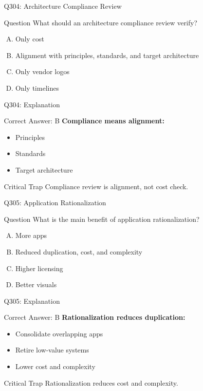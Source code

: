 \documentclass{beamer}
\begin{document}
	\begin{frame}{Q304: Architecture Compliance Review}
		\begin{block}{Question}
			What should an architecture compliance review verify?
		\end{block}
		\begin{enumerate}[(A)]
			\item Only cost
			\item Alignment with principles, standards, and target architecture
			\item Only vendor logos
			\item Only timelines
		\end{enumerate}
	\end{frame}
	
	\begin{frame}{Q304: Explanation}
		\begin{block}{Correct Answer: B}
			\textbf{Compliance means alignment:}
			\begin{itemize}
				\item Principles
				\item Standards
				\item Target architecture
			\end{itemize}
		\end{block}
		\begin{alertblock}{Critical Trap}
			Compliance review is alignment, not cost check.
		\end{alertblock}
	\end{frame}
	
	\begin{frame}{Q305: Application Rationalization}
		\begin{block}{Question}
			What is the main benefit of application rationalization?
		\end{block}
		\begin{enumerate}[(A)]
			\item More apps
			\item Reduced duplication, cost, and complexity
			\item Higher licensing
			\item Better visuals
		\end{enumerate}
	\end{frame}
	
	\begin{frame}{Q305: Explanation}
		\begin{block}{Correct Answer: B}
			\textbf{Rationalization reduces duplication:}
			\begin{itemize}
				\item Consolidate overlapping apps
				\item Retire low-value systems
				\item Lower cost and complexity
			\end{itemize}
		\end{block}
		\begin{alertblock}{Critical Trap}
			Rationalization reduces cost and complexity.
		\end{alertblock}
	\end{frame}
	
\end{document}
